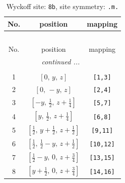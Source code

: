 \documentclass[fleqn,8pt]{jsarticle}
\begin{document}
\begin{longtable}{ccc}
\caption{Wyckoff site: {\tt 8b}, site symmetry: {\tt .m.}}
 \\
 \hline \hline
No. & position & mapping \\ \hline \endfirsthead

\multicolumn{2}{l}{\tablename\ \thetable{}} \\
 \hline \hline
No. & position & mapping \\ \hline \endhead

 \hline \hline
\multicolumn{2}{r}{\footnotesize\it continued ...} \\ \endfoot

 \hline \hline
\multicolumn{2}{r}{} \\ \endlastfoot

1 & $\left[ 0,\, y,\, z \right]$ & {\tt [1,3]} \\ \hline
2 & $\left[ 0,\, - y,\, z \right]$ & {\tt [2,4]} \\ \hline
3 & $\left[ - y,\, \frac{1}{2},\, z + \frac{1}{4} \right]$ & {\tt [5,7]} \\ \hline
4 & $\left[ y,\, \frac{1}{2},\, z + \frac{1}{4} \right]$ & {\tt [6,8]} \\ \hline
5 & $\left[ \frac{1}{2},\, y + \frac{1}{2},\, z + \frac{1}{2} \right]$ & {\tt [9,11]} \\ \hline
6 & $\left[ \frac{1}{2},\, \frac{1}{2} - y,\, z + \frac{1}{2} \right]$ & {\tt [10,12]} \\ \hline
7 & $\left[ \frac{1}{2} - y,\, 0,\, z + \frac{3}{4} \right]$ & {\tt [13,15]} \\ \hline
8 & $\left[ y + \frac{1}{2},\, 0,\, z + \frac{3}{4} \right]$ & {\tt [14,16]} \\
\end{longtable}
\renewcommand{\arraystretch}{1.2}
\end{document}
